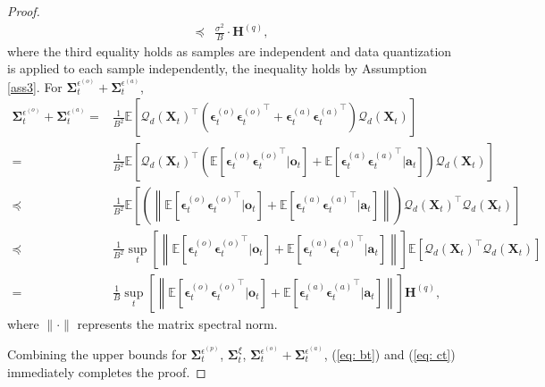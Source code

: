 \documentclass[11pt, letterpaper]{article}
\begin{document}
\begin{proof}
\begin{equation}
\begin{aligned}
            \preceq&\frac{\sigma^2}{B}\cdot\mathbf{H}^{(q)},
        \end{aligned}
    \end{equation}
    where the third equality holds as samples are independent and data quantization is applied to each sample independently, the inequality holds by Assumption \ref{ass3}. For $\boldsymbol{\Sigma}_t^{\epsilon^{(o)}}+\boldsymbol{\Sigma}_t^{\epsilon^{(a)}}$,
    \begin{equation*}
        \begin{aligned}
            \boldsymbol{\Sigma}_t^{\epsilon^{(o)}}+\boldsymbol{\Sigma}_t^{\epsilon^{(a)}}=&\frac{1}{B^2}\mathbb{E}\left[{\mathcal{Q}_d(\mathbf{X}_t)}^\top (\boldsymbol{\epsilon}_t^{(o)}{\boldsymbol{\epsilon}_t^{(o)}}^\top+\boldsymbol{\epsilon}_t^{(a)}{\boldsymbol{\epsilon}_t^{(a)}}^\top) \mathcal{Q}_d(\mathbf{X}_t)\right]\\
            =&\frac{1}{B^2}\mathbb{E}\left[{\mathcal{Q}_d(\mathbf{X}_t)}^\top \left(\mathbb{E}\left[\boldsymbol{\epsilon}_t^{(o)}{\boldsymbol{\epsilon}_t^{(o)}}^\top|\mathbf{o}_t\right] +\mathbb{E}\left[\boldsymbol{\epsilon}_t^{(a)}{\boldsymbol{\epsilon}_t^{(a)}}^\top|\mathbf{a}_t\right] \right)\mathcal{Q}_d(\mathbf{X}_t)\right]\\
            \preceq &\frac{1}{B^2}\mathbb{E}\left[\left(\left\|\mathbb{E}\left[\boldsymbol{\epsilon}_t^{(o)}{\boldsymbol{\epsilon}_t^{(o)}}^\top|\mathbf{o}_t\right] +\mathbb{E}\left[\boldsymbol{\epsilon}_t^{(a)}{\boldsymbol{\epsilon}_t^{(a)}}^\top|\mathbf{a}_t\right] \right\|\right){\mathcal{Q}_d(\mathbf{X}_t)}^\top  \mathcal{Q}_d(\mathbf{X}_t)\right]\\
            \preceq & \frac{1}{B^2}\sup_t \left[\left\|\mathbb{E}\left[\boldsymbol{\epsilon}_t^{(o)}{\boldsymbol{\epsilon}_t^{(o)}}^\top|\mathbf{o}_t\right]+\mathbb{E}\left[\boldsymbol{\epsilon}_t^{(a)}{\boldsymbol{\epsilon}_t^{(a)}}^\top|\mathbf{a}_t\right] \right\|\right] \mathbb{E}\left[{\mathcal{Q}_d(\mathbf{X}_t)}^\top  \mathcal{Q}_d(\mathbf{X}_t)\right]\\
            =&\frac{1}{B}\sup_t \left[\left\|\mathbb{E}\left[\boldsymbol{\epsilon}_t^{(o)}{\boldsymbol{\epsilon}_t^{(o)}}^\top|\mathbf{o}_t\right]+\mathbb{E}\left[\boldsymbol{\epsilon}_t^{(a)}{\boldsymbol{\epsilon}_t^{(a)}}^\top|\mathbf{a}_t\right] \right\|\right] \mathbf{H}^{(q)},
        \end{aligned}
    \end{equation*}
    where $\|\cdot\|$ represents the matrix spectral norm.

    Combining the upper bounds for $\boldsymbol{\Sigma}_t^{\epsilon^{(p)}}$, $\boldsymbol{\Sigma}_t^\xi$, $\boldsymbol{\Sigma}_t^{\epsilon^{(o)}}+\boldsymbol{\Sigma}_t^{\epsilon^{(a)}}$, (\ref{eq: bt}) and (\ref{eq: ct}) immediately completes the proof.
\end{proof}
\end{document}
